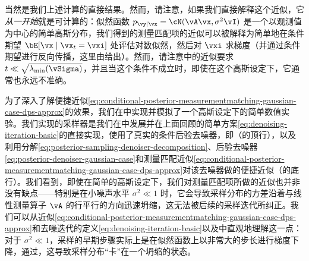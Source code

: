 \documentclass[../../book-main_zh.tex]{subfiles}
\begin{document}
\begin{example}
  当然是我们上述计算的直接结果。然而，请注意，如果我们直接解释这个近似，它\textit{从一开始}就是可计算的：似然函数 $p_{\vy \mid \vx} = \cN(\vA\vx, \sigma^2 \vI)$ 是一个以观测值为中心的简单高斯分布，我们得到的测量匹配项的近似可以被解释为简单地在条件期望 $\bE[\vx \mid \vx_t = \vxi]$ 处评估对数似然，然后对 $\vxi$ 求梯度（并通过条件期望进行反向传播，这里由给出）。然而，请注意中的近似要求 $t \ll \sqrt{\lambda_{\min}(\vSigma)}$，并且当这个条件不成立时，即使在这个高斯设定下，它通常也永远不准确。

  为了深入了解便捷近似\eqref{eq:conditional-posterior-measurementmatching-gaussian-case-dps-approx}的效果，我们在中实现并模拟了一个高斯设定下的简单数值实验。我们实现的采样器是我们在中发展并在上面回顾的简单方案\eqref{eq:denoising-iteration-basic}的直接实现，使用了真实的条件后验去噪器，即（的顶行），以及利用分解\eqref{eq:posterior-sampling-denoiser-decomposition}、后验去噪器\eqref{eq:posterior-denoiser-gaussian-case}和测量匹配近似\eqref{eq:conditional-posterior-measurementmatching-gaussian-case-dps-approx}对该去噪器做的便捷近似（的底行）。我们看到，即使在简单的高斯设定下，我们对测量匹配项所做的近似也并非没有缺点——特别是在小噪声水平 $\sigma^2 \ll 1$ 时，它会导致采样分布的方差沿着与线性测量算子 $\vA$ 的行平行的方向迅速坍缩，这无法被后续的采样迭代所纠正。我们可以从近似\eqref{eq:conditional-posterior-measurementmatching-gaussian-case-dps-approx}和去噪迭代的定义\eqref{eq:denoising-iteration-basic}以及中直观地理解这一点：对于 $\sigma^2 \ll 1$，采样的早期步骤实际上是在似然函数上以非常大的步长进行梯度下降，通过，这导致采样分布“卡”在一个坍缩的状态。


\end{example}
\end{document}
